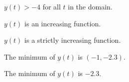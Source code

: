 \documentclass{ximera}
\begin{document}
\begin{exercise}
\begin{question}
\end{question}








\begin{question} 



$y(t) > -4$ for all $t$ in the domain. 
\begin{multipleChoice}
\end{multipleChoice}

\end{question}







\begin{question} 



$y(t)$ is an increasing function.
\begin{multipleChoice}
\end{multipleChoice}

\end{question}





\begin{question} 



$y(t)$ is a strictly increasing function.
\begin{multipleChoice}
\end{multipleChoice}

\end{question}




\begin{question} 



The minimum of $y(t)$ is $(-1, -2.3)$.
\begin{multipleChoice}
\end{multipleChoice}

\end{question}






\begin{question} 



The minimum of $y(t)$ is $-2.3$.
\begin{multipleChoice}
\end{multipleChoice}

\end{question}









\end{exercise}
\end{document}
